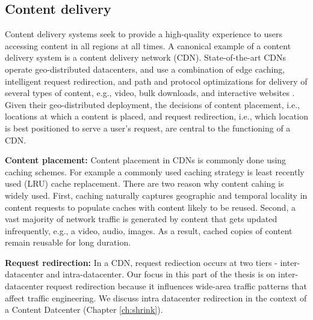 %
%
%


\subsection{Content delivery}
\label{sec:ch2-cdn}

Content delivery systems seek to provide a high-quality experience to users accessing content in all regions  at all times. A canonical example of a content delivery system is a content delivery network (CDN). State-of-the-art CDNs operate geo-distributed datacenters, and use a combination of edge caching, intelligent request redirection, and path and protocol optimizations for delivery of several types of content, e.g., video, bulk downloads, and interactive websites \cite{DilleyMPPSW02,akamai-overview}. Given their geo-distributed deployment, the decisions of content placement, i.e., locations at which a content is placed, and request redirection, i.e., which location is best positioned to serve a user's request, are central to the functioning of a CDN.

\textbf{Content placement:} Content placement in CDNs is commonly done using caching schemes. For example a commonly used caching strategy is least recently used (LRU) cache replacement. There are two reason why content cahing is widely used. First, caching naturally captures geographic and temporal locality in content requests to populate caches with content likely to be reused. Second, a vast majority of network traffic is generated by content that gets updated infrequently, e.g., a video, audio, images. As a result, cached copies of content remain reusable for long duration. 


\textbf{Request redirection:} In a CDN, request rediection occurs at two tiers - inter-datacenter and intra-datacenter. Our focus in this part of the thesis is on inter-datacenter request redirection because it influences wide-area traffic patterns that affect traffic engineering. We discuss intra datacenter redirection in the context of a Content Datcenter (Chapter \ref{ch:shrink}).

